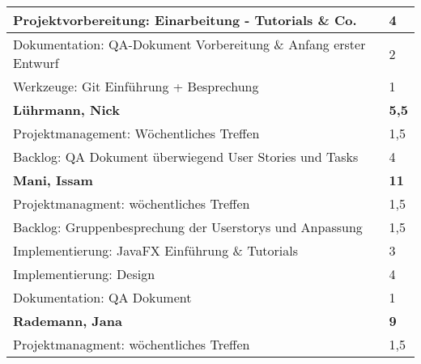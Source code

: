 \documentclass[a4paper,11pt]{scrartcl}
\begin{document}
\begin{longtable}{| p{13.8cm} | C{2.4cm} |}
  Projektvorbereitung: Einarbeitung - Tutorials \& Co.
	&
  4
	\\
	\hline

  Dokumentation: QA-Dokument Vorbereitung \& Anfang erster Entwurf
	&
  2
	\\
	\hline

  Werkzeuge: Git Einführung + Besprechung
	&
  1
	\\
	\hline
	\hline


	\textbf{Lührmann, Nick} & \textbf{5,5}\\ %
	\hline

	Projektmanagement: Wöchentliches Treffen
	&
	1,5
	\\
	\hline

	Backlog: QA Dokument überwiegend User Stories und Tasks
	&
  4
	\\
	\hline
	\hline


	\textbf{Mani, Issam} & \textbf{11}\\ %
	\hline

  Projektmanagment: wöchentliches Treffen
	&
  1,5
	\\
	\hline

  Backlog: Gruppenbesprechung der Userstorys und Anpassung
	&
  1,5
	\\
	\hline

  Implementierung: JavaFX Einführung \& Tutorials
	&
  3
	\\
	\hline

  Implementierung: Design
	&
  4
	\\
	\hline

  Dokumentation: QA Dokument
	&
  1
	\\
	\hline
	\hline


	\textbf{Rademann, Jana} & \textbf{9}\\ %
	\hline

  Projektmanagment: wöchentliches Treffen
	&
  1,5
	\\
	\hline


\end{longtable}
\end{document}

